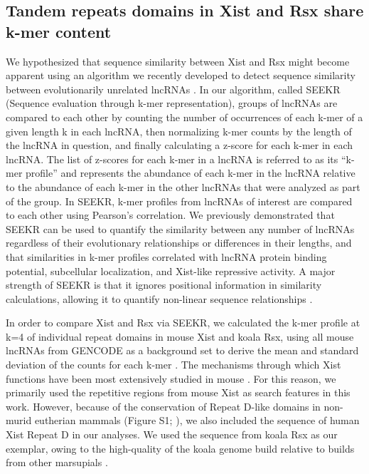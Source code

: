 \subsection{Tandem repeats domains in Xist and Rsx share k-mer content}
We hypothesized that sequence similarity between Xist and Rsx might become apparent using an algorithm we recently developed to detect sequence similarity between evolutionarily unrelated lncRNAs \cite{Kirk2018FunctionalContent}. In our algorithm, called SEEKR (Sequence evaluation through k-mer representation), groups of lncRNAs are compared to each other by counting the number of occurrences of each k-mer of a given length k in each lncRNA, then normalizing k-mer counts by the length of the lncRNA in question, and finally calculating a z-score for each k-mer in each lncRNA. The list of z-scores for each k-mer in a lncRNA is referred to as its “k-mer profile” and represents the abundance of each k-mer in the lncRNA relative to the abundance of each k-mer in the other lncRNAs that were analyzed as part of the group. In SEEKR, k-mer profiles from lncRNAs of interest are compared to each other using Pearson’s correlation. We previously demonstrated that SEEKR can be used to quantify the similarity between any number of lncRNAs regardless of their evolutionary relationships or differences in their lengths, and that similarities in k-mer profiles correlated with lncRNA protein binding potential, subcellular localization, and Xist-like repressive activity. A major strength of SEEKR is that it ignores positional information in similarity calculations, allowing it to quantify non-linear sequence relationships \cite{Kirk2018FunctionalContent}. 

In order to compare Xist and Rsx via SEEKR, we calculated the k-mer profile at k=4 of individual repeat domains in mouse Xist and koala Rsx, using all mouse lncRNAs from GENCODE as a background set to derive the mean and standard deviation of the counts for each k-mer \cite{Derrien2012TheExpression}. The mechanisms through which Xist functions have been most extensively studied in mouse \cite{Sahakyan2018TheCompensation}. For this reason, we primarily used the repetitive regions from mouse Xist as search features in this work. However, because of the conservation of Repeat D-like domains in non-murid eutherian mammals (Figure S1; \cite{Nesterova2001CharacterizationSequence,Yen2007AEutheria}), we also included the sequence of human Xist Repeat D in our analyses. We used the sequence from koala Rsx as our exemplar, owing to the high-quality of the koala genome build relative to builds from other marsupials \cite{Johnson2018AdaptationGenome}.

